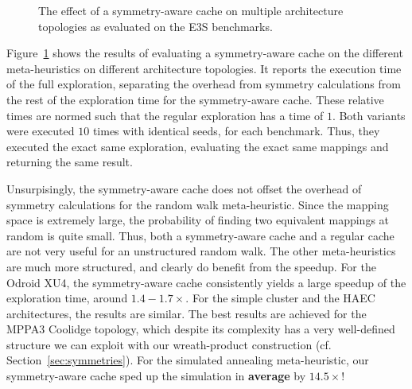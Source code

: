 \begin{figure}[h]
	\centering
   \resizebox{0.95\textwidth}{!}{}
	\caption{The effect of a symmetry-aware cache on multiple architecture topologies as evaluated on the \ac{E3S} benchmarks.}
	\label{fig:symmetry_cache}
\end{figure}


Figure~\ref{fig:symmetry_cache} shows the results of evaluating a symmetry-aware cache on the different meta-heuristics on different architecture topologies.
It reports the execution time of the full exploration, separating the overhead from symmetry calculations from the rest of the exploration time for the symmetry-aware cache.
These relative times are normed such that the regular exploration has a time of $1$. Both variants were executed $10$ times with identical seeds, for each benchmark. 
Thus, they executed the exact same exploration, evaluating the exact same mappings and returning the same result.

Unsurpisingly, the symmetry-aware cache does not offset the overhead of symmetry calculations for the random walk meta-heuristic.
Since the mapping space is extremely large, the probability of finding two equivalent mappings at random is quite small. 
Thus, both a symmetry-aware cache and a regular cache are not very useful for an unstructured random walk.
The other meta-heuristics are much more structured, and clearly do benefit from the speedup.
For the Odroid XU4, the symmetry-aware cache consistently yields a large speedup of the exploration time, around $1.4-1.7 \times$.
For the simple cluster and the \ac{HAEC} architectures, the results are similar.
The best results are achieved for the MPPA3 Coolidge topology, which despite its complexity has a very well-defined structure we can exploit with our wreath-product construction (cf. Section~\ref{sec:symmetries}).
For the simulated annealing meta-heuristic, our symmetry-aware cache sped up the simulation in \textbf{average} by $14.5 \times$!

